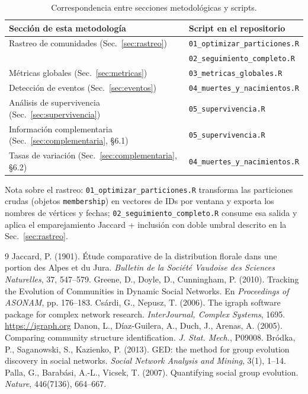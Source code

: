 \documentclass[12pt]{article}
\begin{document}
\begin{table}[H]
\centering
\caption{Correspondencia entre secciones metodológicas y scripts.}
\label{tab:mapeo}
\begin{tabular}{@{}p{} p{}@{}}
\toprule
\textbf{Sección de esta metodología} & \textbf{Script en el repositorio} \\
\midrule
Rastreo de comunidades (Sec.~\ref{sec:rastreo}) &
  \texttt{01\_optimizar\_particiones.R} \\
  & \texttt{02\_seguimiento\_completo.R} \\
\addlinespace
Métricas globales (Sec.~\ref{sec:metricas}) &
  \texttt{03\_metricas\_globales.R} \\
\addlinespace
Detección de eventos (Sec.~\ref{sec:eventos}) &
  \texttt{04\_muertes\_y\_nacimientos.R} \\
\addlinespace
Análisis de supervivencia (Sec.~\ref{sec:supervivencia}) &
  \texttt{05\_supervivencia.R} \\
\addlinespace
Información complementaria (Sec.~\ref{sec:complementaria}, §6.1) &
  \texttt{05\_supervivencia.R} \\
\addlinespace
Tasas de variación (Sec.~\ref{sec:complementaria}, §6.2) &
  \texttt{04\_muertes\_y\_nacimientos.R} \\
\bottomrule
\end{tabular}
\end{table}

\noindent
Nota sobre el rastreo: \texttt{01\_optimizar\_particiones.R} transforma las
particiones crudas (objetos \texttt{membership}) en vectores de IDs por
ventana y exporta los nombres de vértices y fechas; \texttt{02\_seguimiento\_completo.R}
consume esa salida y aplica el emparejamiento Jaccard + inclusión con doble
umbral descrito en la Sec.~\ref{sec:rastreo}.
\begin{thebibliography}{9}
 Jaccard, P. (1901). Étude comparative de la distribution florale dans une portion des Alpes et du Jura. \emph{Bulletin de la Société Vaudoise des Sciences Naturelles}, 37, 547--579.
 Greene, D., Doyle, D., Cunningham, P. (2010). Tracking the Evolution of Communities in Dynamic Social Networks. En \emph{Proceedings of ASONAM}, pp. 176--183.
 Csárdi, G., Nepusz, T. (2006). The igraph software package for complex network research. \emph{InterJournal, Complex Systems}, 1695. \url{https://igraph.org}
 Danon, L., Díaz-Guilera, A., Duch, J., Arenas, A. (2005). Comparing community structure identification. \emph{J. Stat. Mech.}, P09008.
 Bródka, P., Saganowski, S., Kazienko, P. (2013). GED: the method for group evolution discovery in social networks. \emph{Social Network Analysis and Mining}, 3(1), 1--14.
 Palla, G., Barabási, A.-L., Vicsek, T. (2007). Quantifying social group evolution. \emph{Nature}, 446(7136), 664--667.
\end{thebibliography}
\end{document}

